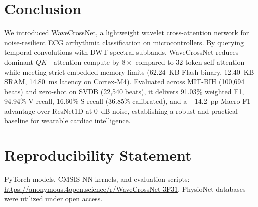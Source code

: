 \documentclass[conference]{IEEEtran}
\begin{document}
\section{Conclusion}
\label{sec:conclusion}

We introduced WaveCrossNet, a lightweight wavelet cross-attention network for noise-resilient ECG arrhythmia classification on microcontrollers. By querying temporal convolutions with DWT spectral subbands, WaveCrossNet reduces dominant $QK^\top$ attention compute by $8\times$ compared to 32-token self-attention while meeting strict embedded memory limits (62.24~KB Flash binary, 12.40~KB SRAM, 14.80~ms latency on Cortex-M4). Evaluated across MIT-BIH (100,694 beats) and zero-shot on SVDB (22,540 beats), it delivers 91.03\% weighted F1, 94.94\% V-recall, 16.60\% S-recall (36.85\% calibrated), and a +14.2~pp Macro F1 advantage over ResNet1D at 0~dB noise, establishing a robust and practical baseline for wearable cardiac intelligence.

\section*{Reproducibility Statement}
PyTorch models, CMSIS-NN kernels, and evaluation scripts: \url{https://anonymous.4open.science/r/WaveCrossNet-3F31}. PhysioNet databases were utilized under open access.

\footnotesize
\def\BIBdecl{%
  \setlength{\itemsep}{0.8pt plus 0.3pt minus 0.2pt}%
  \setlength{\parsep}{0pt}%
}


\end{document}
